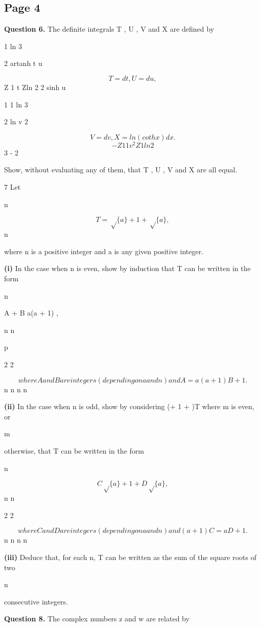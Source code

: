 \documentclass[12pt]{article}
\begin{document}
\subsection*{Page 4}
\begin{flushleft}
\bigskip\textbf{Question 6.} The definite integrals T , U , V and X are defined by\par
1 ln 3\par
2 artanh t u\par
\[T = dt , U = du ,\]
Z 1 t Zln 2 2 sinh u\par
1 1 ln 3\par
2 ln v 2\par
\[V = dv , X = ln(coth x) dx .\]
\[- Z 1 1 v^2 Z 1 ln 2\]
3 - 2\par
Show, without evaluating any of them, that T , U , V and X are all equal.\par
7 Let\par
n\par
\[T = \sqrt\{a\} + 1 + \sqrt\{a\} ,\]
n\par
where n is a positive integer and a is any given positive integer.\par
\textbf{(i)} In the case when n is even, show by induction that T can be written in the form\par
n\par
A + B a(a + 1) ,\par
n n\par
p\par
2 2\par
\[where A and B are integers (depending on a and n) and A = a(a + 1)B + 1.\]
n n n n\par
\textbf{(ii)} In the case when n is odd, show by considering (\sqrta + 1 + \sqrta)T where m is even, or\par
m\par
otherwise, that T can be written in the form\par
n\par
\[C \sqrt\{a\} + 1 + D \sqrt\{a\} ,\]
n n\par
2 2\par
\[where C and D are integers (depending on a and n) and (a + 1)C = aD + 1 .\]
n n n n\par
\textbf{(iii)} Deduce that, for each n, T can be written as the sum of the square roots of two\par
n\par
consecutive integers.\par
\bigskip\textbf{Question 8.} The complex numbers z and w are related by\par

\end{flushleft}
\end{document}
